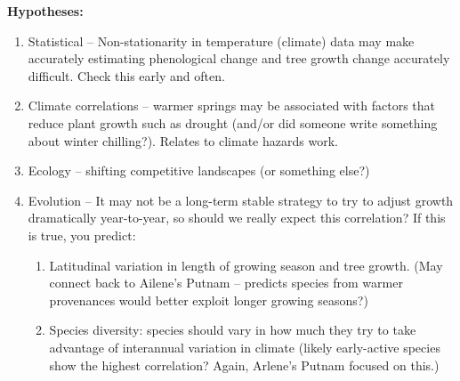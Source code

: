 \documentclass[11pt,letter]{article}
\begin{document}
{\bf Hypotheses:}
\begin{enumerate}
\item Statistical -- Non-stationarity in temperature (climate) data may make accurately estimating phenological change and tree growth change accurately difficult. Check this early and often. 
\item Climate correlations -- warmer springs may be associated with factors that reduce plant growth such as drought (and/or did someone write something about winter chilling?). Relates to climate hazards work. 
\item Ecology -- shifting competitive landscapes (or something else?) 
\item Evolution -- It may not be a long-term stable strategy to try to adjust growth dramatically year-to-year, so should we really expect this correlation? If this is true, you predict:
\begin{enumerate}
\item Latitudinal variation in length of growing season and tree growth. (May connect back to Ailene's Putnam -- predicts species from warmer provenances would better exploit longer growing seasons?) 
\item Species diversity: species should vary in how much they try to take advantage of interannual variation in climate (likely early-active species show the highest correlation? Again, Arlene's Putnam focused on this.)
\end{enumerate}
\end{enumerate}


\end{document}
